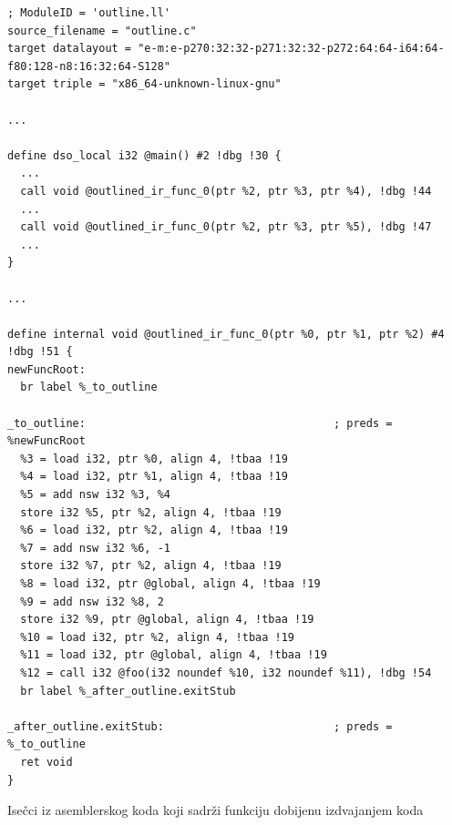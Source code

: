 \documentclass[12pt,oneside]{memoir}
\begin{document}
\begin{listing}[!ht]

\begin{verbatim}
; ModuleID = 'outline.ll'
source_filename = "outline.c"
target datalayout = "e-m:e-p270:32:32-p271:32:32-p272:64:64-i64:64-f80:128-n8:16:32:64-S128"
target triple = "x86_64-unknown-linux-gnu"

...

define dso_local i32 @main() #2 !dbg !30 {
  ...
  call void @outlined_ir_func_0(ptr %2, ptr %3, ptr %4), !dbg !44
  ...
  call void @outlined_ir_func_0(ptr %2, ptr %3, ptr %5), !dbg !47
  ...
}

...

define internal void @outlined_ir_func_0(ptr %0, ptr %1, ptr %2) #4 !dbg !51 {
newFuncRoot:
  br label %_to_outline

_to_outline:                                      ; preds = %newFuncRoot
  %3 = load i32, ptr %0, align 4, !tbaa !19
  %4 = load i32, ptr %1, align 4, !tbaa !19
  %5 = add nsw i32 %3, %4
  store i32 %5, ptr %2, align 4, !tbaa !19
  %6 = load i32, ptr %2, align 4, !tbaa !19
  %7 = add nsw i32 %6, -1
  store i32 %7, ptr %2, align 4, !tbaa !19
  %8 = load i32, ptr @global, align 4, !tbaa !19
  %9 = add nsw i32 %8, 2
  store i32 %9, ptr @global, align 4, !tbaa !19
  %10 = load i32, ptr %2, align 4, !tbaa !19
  %11 = load i32, ptr @global, align 4, !tbaa !19
  %12 = call i32 @foo(i32 noundef %10, i32 noundef %11), !dbg !54
  br label %_after_outline.exitStub

_after_outline.exitStub:                          ; preds = %_to_outline
  ret void
}
\end{verbatim}
\caption{Isečci iz asemblerskog koda koji sadrži funkciju dobijenu izdvajanjem koda}
\label{lst:outline_program_asm}
\end{listing}
\end{document}
